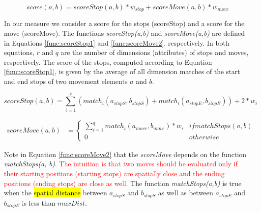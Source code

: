 \documentclass[12pt]{article}
\begin{document}
\begin{equation}
\label{func:score1}
score(a, b) = scoreStop(a, b) * w_{stop} + scoreMove(a, b) * w_{move}  
\end{equation}


In our measure we consider a score for the stops (scoreStop) and a score for the move (scoreMove). The functions \emph{scoreStop(a,b)} and \emph{scoreMove(a,b)} are defined in Equations \ref{func:scoreStop1} and \ref{func:scoreMove2}, respectively. In both equations, $r$ and $q$ are the number of dimensions (attributes) of stops and moves, respectively. The score of the stops, computed according to Equation \ref{func:scoreStop1}, is given by the average of all dimension matches of the start and end stops of two movement elements $a$ and $b$. 


\begin{equation}
\label{func:scoreStop1}
  scoreStop(a, b) = \sum\limits_{i=1}^r (match_i(a_{stopS}, b_{stopS}) + match_i(a_{stopE}, b_{stopE}))\div 2* w_{i}
\end{equation}


\begin{equation}
\label{func:scoreMove2}
\begin{split}
scoreMove(a, b)  & = 
  \begin{cases} 
      \sum\limits_{i=1}^q match_i(a_{move}, b_{move}) * w_{i} & if matchStops(a, b)\\
      0 & otherwise
  \end{cases}
\end{split}
\end{equation}


Note in Equation \ref{func:scoreMove2} that the \emph{scoreMove} depends on the function \textit{matchStops(a, b)}. \textcolor{red}{The intuition is that two moves should be evaluated only if their starting positions (starting stops) are spatially close and the ending positions (ending stops) are close as well.}
    The function \emph{matchStops(a,b)} is true when the \hl{spatial distance} between $a_{stopS}$ and $b_{stopS}$  as well as between $a_{stopE}$ and $b_{stopE}$ is less than $maxDist$.
    
\end{document}
